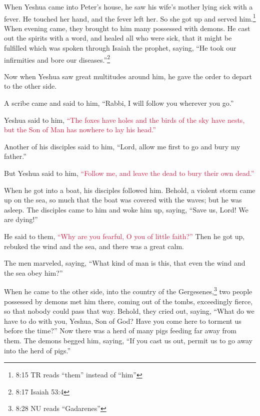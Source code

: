 \myverse{}When Yeshua came into Peter’s house, he saw his wife’s mother
lying sick with a fever.
\myverse{}He touched her hand, and the fever left her. So she got up and served him.\footnote{8:15 TR reads “them” instead of “him”}
\myverse{}When evening came, they brought to him many possessed with demons. He cast
out the spirits with a word, and healed all who were sick,
\myverse{}that it might be fulfilled which was spoken through Isaiah the prophet, saying,
“He took our infirmities and bore our diseases.”\footnote{8:17 Isaiah 53:4
}

\myverse{}Now when Yeshua saw great multitudes around him, he gave the
order to depart to the other side.

\myverse{}A scribe came and said to him, “Rabbi, I will follow you wherever
you go.”

\myverse{}Yeshua said to him,
\textcolor{crimson}{“The foxes have holes and the birds of the sky have nests, but the Son of Man has nowhere to lay his
	head.”}

\myverse{}Another of his disciples said to him, “Lord, allow me first to
go and bury my father.”

\myverse{}But Yeshua said to him,
\textcolor{crimson}{“Follow me, and leave the dead to bury their own dead.”}

\myverse{}When he got into a boat, his disciples followed him.
\myverse{}Behold, a violent storm came up on the sea, so much that the boat was covered
with the waves; but he was asleep.
\myverse{}The disciples came to him and woke him up, saying, “Save us, Lord! We are
dying!”

\myverse{}He said to them,
\textcolor{crimson}{“Why are you fearful, O you of little faith?”
} Then he got up, rebuked the wind and the sea, and there was a great calm.

\myverse{}The men marveled, saying, “What kind of man is this, that even
the wind and the sea obey him?”

\myverse{}When he came to the other side, into the country of the Gergesenes,\footnote{8:28 NU reads “Gadarenes”} two people possessed by demons met him there, coming out of the
tombs, exceedingly fierce, so that nobody could pass that way.
\myverse{}Behold, they cried out, saying, “What do we have to do with you, Yeshua, Son
of God? Have you come here to torment us before the time?”
\myverse{}Now there was a herd of many pigs feeding far away from them.
\myverse{}The demons begged him, saying, “If you cast us out, permit us to go away into
the herd of pigs.”

